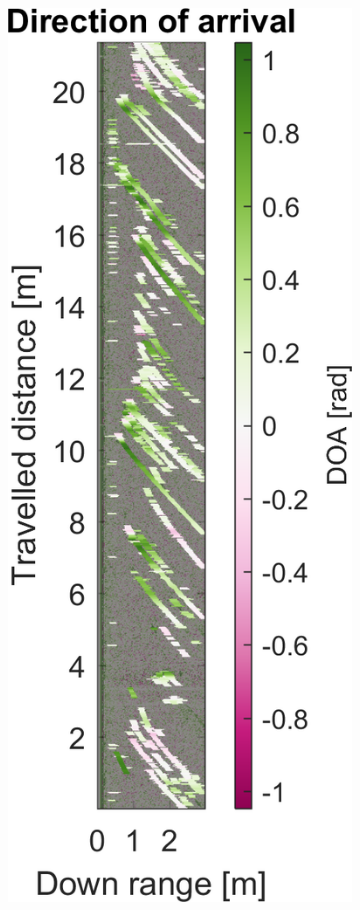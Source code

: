 \begin{figure}[htbp]
\begin{subfigure}[t]{0.475\linewidth}
    \end{subfigure}\bigskip\\
    \begin{subfigure}[t]{0.475\linewidth}
        \centering
        \includegraphics[width=\linewidth,max height=.475\textheight]{gfx/results/orbit_doa.png}

\end{subfigure}
\end{figure}

